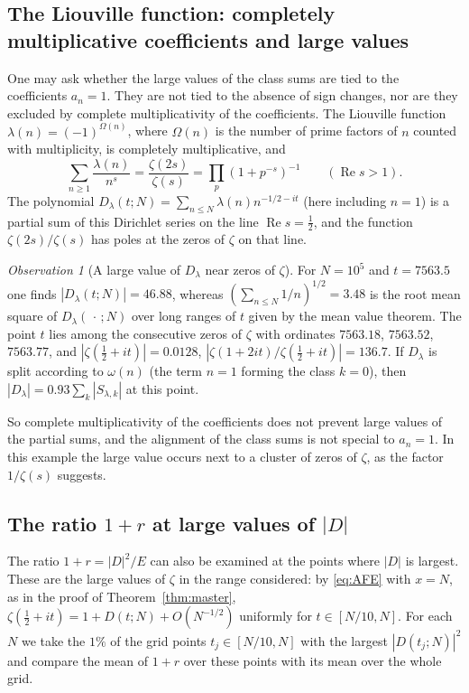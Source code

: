\documentclass[11pt]{amsart}
\theoremstyle{definition}
\theoremstyle{remark}
\newtheorem{observation}[theorem]{Observation}
\newcommand{\half}{\tfrac{1}{2}}
\newcommand{\re}{\operatorname{Re}}
\begin{document}
\subsection{The Liouville function: completely multiplicative coefficients
and large values}\label{sec:liouville}

One may ask whether the large values of the class sums are tied to the
coefficients $a_n=1$.  They are not tied to the absence of sign changes,
nor are they excluded by complete multiplicativity of the coefficients.
The Liouville function $\lambda(n)=(-1)^{\Omega(n)}$, where $\Omega(n)$ is
the number of prime factors of $n$ counted with multiplicity, is
completely multiplicative, and
\[
\sum_{n\ge1}\frac{\lambda(n)}{n^s}=\frac{\zeta(2s)}{\zeta(s)}
=\prod_p(1+p^{-s})^{-1}
\qquad(\re s>1).
\]
The polynomial $D_\lambda(t;N)=\sum_{n\le N}\lambda(n)n^{-1/2-it}$ (here
including $n=1$) is a partial sum of this Dirichlet series on the line
$\re s=\half$, and the function $\zeta(2s)/\zeta(s)$ has poles at the
zeros of $\zeta$ on that line.

\begin{observation}[A large value of $D_\lambda$ near zeros of $\zeta$]
\label{obs:liouville}
For $N=10^5$ and $t=7563.5$ one finds $|D_\lambda(t;N)|=46.88$, whereas
$(\sum_{n\le N}1/n)^{1/2}=3.48$ is the root mean square of
$D_\lambda(\,\cdot\,;N)$ over long ranges of $t$ given by the mean value
theorem.  The point $t$ lies among the consecutive zeros of $\zeta$ with
ordinates $7563.18$, $7563.52$, $7563.77$, and
$|\zeta(\half+it)|=0.0128$,
$|\zeta(1+2it)/\zeta(\half+it)|=136.7$.  If $D_\lambda$ is split according
to $\omega(n)$ (the term $n=1$ forming the class $k=0$), then
$|D_\lambda|=0.93\sum_k|S_{\lambda,k}|$ at this point.
\end{observation}

So complete multiplicativity of the coefficients does not prevent large
values of the partial sums, and the alignment of the class sums is not
special to $a_n=1$.  In this example the large value occurs next to a
cluster of zeros of $\zeta$, as the factor $1/\zeta(s)$ suggests.

\subsection{The ratio \texorpdfstring{$1+r$}{1+r} at large values of \texorpdfstring{$|D|$}{|D|}}\label{sec:peaks}

The ratio $1+r=|D|^2/E$ can also be examined at the points where $|D|$ is
largest.  These are the large values of $\zeta$ in the range considered:
by \eqref{eq:AFE} with $x=N$, as in the proof of
Theorem~\ref{thm:master}, $\zeta(\half+it)=1+D(t;N)+O(N^{-1/2})$
uniformly for $t\in[N/10,N]$.  For each $N$ we take the
$1\%$ of the grid points $t_j\in[N/10,N]$ with the largest $|D(t_j;N)|^2$
and compare the mean of $1+r$ over these points with its mean over the
whole grid.
\end{document}
